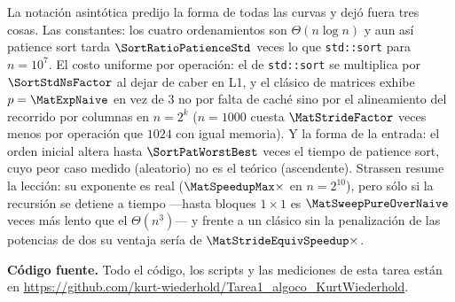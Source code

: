 
La notación asintótica predijo la forma de todas las curvas y dejó fuera tres
cosas. Las constantes: los cuatro ordenamientos son $\Theta(n\log n)$ y aun así
patience sort tarda $\SortRatioPatienceStd$ veces lo que \texttt{std::sort}
para $n=10^{7}$. El costo uniforme por operación: el de \texttt{std::sort} se
multiplica por $\SortStdNsFactor$ al dejar de caber en L1, y el clásico de
matrices exhibe $p=\MatExpNaive$ en vez de $3$ no por falta de caché sino por
el alineamiento del recorrido por columnas en $n=2^{k}$ ($n=1000$ cuesta
$\MatStrideFactor$ veces menos por operación que $1024$ con igual memoria). Y la
forma de la entrada: el orden inicial altera hasta $\SortPatWorstBest$ veces el
tiempo de patience sort, cuyo peor caso medido (aleatorio) no es el teórico
(ascendente). Strassen resume la lección: su exponente es real
($\MatSpeedupMax\times$ en $n=2^{10}$), pero sólo si la recursión se detiene a
tiempo —hasta bloques $1\times1$ es $\MatSweepPureOverNaive$ veces más lento
que el $\Theta(n^{3})$— y frente a un clásico sin la penalización de las
potencias de dos su ventaja sería de $\MatStrideEquivSpeedup\times$.

\medskip
\noindent\textbf{Código fuente.} Todo el código, los scripts y las mediciones de esta
tarea están en \url{https://github.com/kurt-wiederhold/Tarea1_algoco_KurtWiederhold}.
